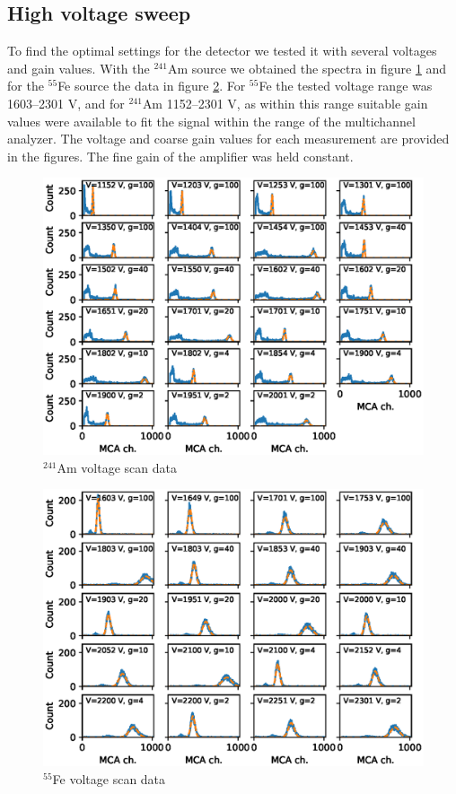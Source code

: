 \documentclass[a4paper]{article}
\begin{document}
\clearpage
\subsection{High voltage sweep}
\label{results_hv}
To find the optimal settings for the detector we tested it with several voltages and gain values.
With the $^{241}$Am source we obtained the spectra in figure \ref{fig:am_scan_fits} and for the $^{55}$Fe source the data in figure \ref{fig:fe_scan_fits}.
For $^{55}$Fe the tested voltage range was 1603--2301 V, and for $^{241}$Am 1152--2301 V, as within this range suitable gain values were available to fit the signal within the range of the multichannel analyzer.
The voltage and coarse gain values for each measurement are provided in the figures.
The fine gain of the amplifier was held constant.

\begin{figure}[ht!]
\centering
\includegraphics[width=\textwidth]{fig/python/am_scan_fits.eps}
\caption{$^{241}$Am voltage scan data}
\label{fig:am_scan_fits}
\end{figure}

\begin{figure}[ht!]
\centering
\includegraphics[width=\textwidth]{fig/python/fe_scan_fits.eps}
\caption{$^{55}$Fe voltage scan data}
\label{fig:fe_scan_fits}
\end{figure}
\end{document}
